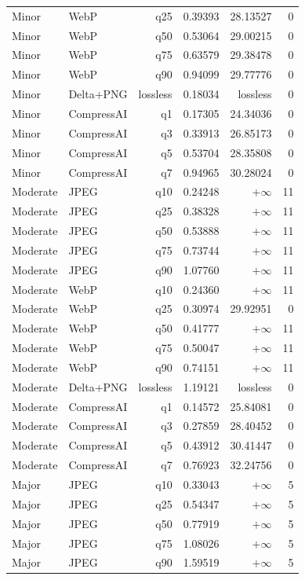 \begin{longtable}{llrrrr}
Minor & WebP & q25 & 0.39393 & 28.13527 & 0\\
Minor & WebP & q50 & 0.53064 & 29.00215 & 0\\
Minor & WebP & q75 & 0.63579 & 29.38478 & 0\\
Minor & WebP & q90 & 0.94099 & 29.77776 & 0\\
Minor & Delta+PNG & lossless & 0.18034 & lossless & 0\\
Minor & CompressAI & q1 & 0.17305 & 24.34036 & 0\\
Minor & CompressAI & q3 & 0.33913 & 26.85173 & 0\\
Minor & CompressAI & q5 & 0.53704 & 28.35808 & 0\\
Minor & CompressAI & q7 & 0.94965 & 30.28024 & 0\\
Moderate & JPEG & q10 & 0.24248 & $+\infty$ & 11\\
Moderate & JPEG & q25 & 0.38328 & $+\infty$ & 11\\
Moderate & JPEG & q50 & 0.53888 & $+\infty$ & 11\\
Moderate & JPEG & q75 & 0.73744 & $+\infty$ & 11\\
Moderate & JPEG & q90 & 1.07760 & $+\infty$ & 11\\
Moderate & WebP & q10 & 0.24360 & $+\infty$ & 11\\
Moderate & WebP & q25 & 0.30974 & 29.92951 & 0\\
Moderate & WebP & q50 & 0.41777 & $+\infty$ & 11\\
Moderate & WebP & q75 & 0.50047 & $+\infty$ & 11\\
Moderate & WebP & q90 & 0.74151 & $+\infty$ & 11\\
Moderate & Delta+PNG & lossless & 1.19121 & lossless & 0\\
Moderate & CompressAI & q1 & 0.14572 & 25.84081 & 0\\
Moderate & CompressAI & q3 & 0.27859 & 28.40452 & 0\\
Moderate & CompressAI & q5 & 0.43912 & 30.41447 & 0\\
Moderate & CompressAI & q7 & 0.76923 & 32.24756 & 0\\
Major & JPEG & q10 & 0.33043 & $+\infty$ & 5\\
Major & JPEG & q25 & 0.54347 & $+\infty$ & 5\\
Major & JPEG & q50 & 0.77919 & $+\infty$ & 5\\
Major & JPEG & q75 & 1.08026 & $+\infty$ & 5\\
Major & JPEG & q90 & 1.59519 & $+\infty$ & 5\\

\end{longtable}
